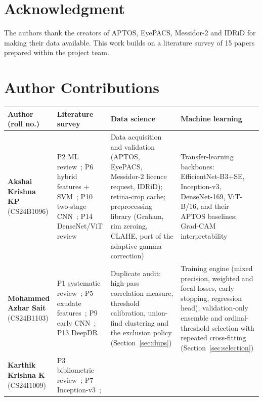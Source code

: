 \documentclass[journal]{IEEEtran}
\renewcommand{\arraystretch}{1.08}
\begin{document}
\section*{Acknowledgment}
The authors thank the creators of APTOS, EyePACS, Messidor-2 and IDRiD for making their data
available. This work builds on a literature survey of 15 papers prepared within the project team.




\clearpage
\onecolumn
\section*{Author Contributions}
\begin{table}[!h]
\centering
\footnotesize
\setlength{\tabcolsep}{3.5pt}
\renewcommand{\arraystretch}{1.25}
\begin{tabular}{@{}>{\raggedright\arraybackslash}p{3.0cm}>{\raggedright\arraybackslash}p{4.1cm}>{\raggedright\arraybackslash}p{5.0cm}>{\raggedright\arraybackslash}p{5.2cm}@{}}
\toprule
Author (roll no.) & Literature survey & Data science & Machine learning \\
\midrule
\textbf{Akshai Krishna KP} (CS24B1096) &
P2 ML review~\cite{tato2025review}; P6 hybrid features + SVM~\cite{butt2022hybrid};
P10 two-stage CNN~\cite{zafar2025lightweight}; P14 DenseNet/ViT review~\cite{banerjee2025review} &
Data acquisition and validation (APTOS, EyePACS, Messidor-2 licence request, IDRiD); retina-crop
cache; preprocessing library (Graham, rim zeroing, CLAHE, port of the adaptive gamma correction) &
Transfer-learning backbones: EfficientNet-B3+SE, Inception-v3, DenseNet-169, ViT-B/16, and their
APTOS baselines; Grad-CAM interpretability \\
\addlinespace
\textbf{Mohammed Azhar Sait} (CS24B1103) &
P1 systematic review~\cite{dejene2025screening}; P5 exudate features~\cite{sisodia2017preprocessing};
P9 early CNN~\cite{pratt2016cnn}; P13 DeepDR~\cite{dai2021deepdr} &
Duplicate audit: high-pass correlation measure, threshold calibration, union-find clustering and the
exclusion policy (Section~\ref{sec:dups}) &
Training engine (mixed precision, weighted and focal losses, early stopping, regression head);
validation-only ensemble and ordinal-threshold selection with repeated cross-fitting
(Section~\ref{sec:selection}) \\
\addlinespace
\textbf{Karthik Krishna K} (CS24I1009) &
P3 bibliometric review~\cite{subramanian2022styles}; P7 Inception-v3~\cite{gulshan2016development};

\end{tabular}
\end{table}
\end{document}
